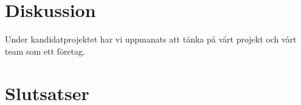 \section{Diskussion}
\label{sec:discussion-hampus}

Under kandidatprojektet har vi uppmanats att tänka på vårt projekt och vårt team som ett företag. 

\section{Slutsatser}
\label{sec:conclusions-hampus}


